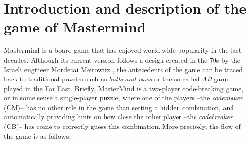 \documentclass[preprint,12pt]{elsarticle}
\def\codemaker{CM}
\def\codebreaker{CB}
\begin{document}
\section{Introduction and description of the game of Mastermind}
\label{s:intro}

Mastermind \cite{mm:mathworld} is a board game that has enjoyed
world-wide popularity in the last decades. Although its current version
follows a design created in the 70s by the Israeli engineer Mordecai Meirowitz
\cite{wiki:mm}, the antecedents of the game can be
traced back 
to traditional puzzles such as \emph{bulls and cows} \cite{francisstrategies:moo} or the so-called \emph{AB}
\cite{Chen2007435} game played in the Far East. Briefly, MasterMind is a two-player
code-breaking game, or in some sense a single-player puzzle, where one of the
players --the \emph{codemaker} (\codemaker)-- has no other role in the game than
setting a hidden combination, and automatically providing hints on
how close the other player --the \emph{codebreaker} (\codebreaker)-- has
come to correctly guess this combination. More precisely, the flow of the game
is as follows:
\end{document}
